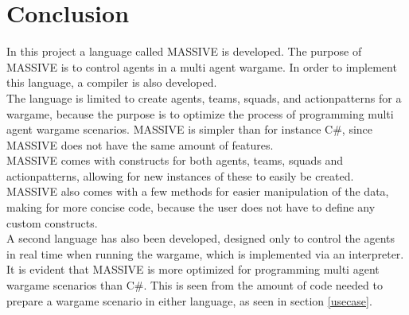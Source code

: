 \chapter{Conclusion}

In this project a language called MASSIVE is developed. The purpose of MASSIVE is to control agents in a multi agent wargame. In order to implement this language, a compiler is also developed.\\ \indent
The language is limited to create agents, teams, squads, and actionpatterns for a wargame, because the purpose is to optimize the process of programming multi agent wargame scenarios. MASSIVE is simpler than for instance C\#, since MASSIVE does not have the same amount of features.\\ \indent
MASSIVE comes with constructs for both agents, teams, squads and actionpatterns, allowing for new instances of these to easily be created. MASSIVE also comes with a few methods for easier manipulation of the data, making for more concise code, because the user does not have to define any custom constructs.\\ \indent
A second language has also been developed, designed only to control the agents in real time when running the wargame, which is implemented via an interpreter.\\ \indent
It is evident that MASSIVE is more optimized for programming multi agent wargame scenarios than C\#. This is seen from the amount of code needed to prepare a wargame scenario in either language, as seen in section \ref{usecase}.